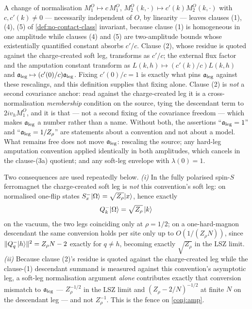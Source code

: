 \begin{scope}
\label{scope:amputation-convention}
A change of normalisation $M_1^O\mapsto c\,M_1^O$,
$M_2^O(k,\cdot)\mapsto c'(k)M_2^O(k,\cdot)$ with $c,c'(k)\neq0$ --- necessarily
independent of $O$, by linearity --- leaves clauses (1), (4), (5) of
\cref{def:no-contact-class} invariant, because clause (1) is homogeneous in
one amplitude while clauses (4) and (5) are two-amplitude bounds whose
existentially quantified constant absorbs $c'/c$. Clause (2), whose residue is
quoted against the charge-created soft leg, transforms as $c'/c$; the external
flux factor and the amputation constant transform as
$L(k,h)\mapsto(c'(k)/c)L(k,h)$ and $\mathfrak{a}_{\mathrm{leg}}\mapsto(c'(0)/c)\mathfrak{a}_{\mathrm{leg}}$. Fixing
$c'(0)/c=1$ is exactly what pins $\mathfrak{a}_{\mathrm{leg}}$ against these rescalings, and this
definition supplies that fixing alone. Clause (2) is \emph{not} a second
covariance anchor: read against the charge-created leg it is a
cross-normalisation \emph{membership} condition on the source, tying the
descendant term to $2iv_hM_1^O$, and it is that --- not a second fixing of the
covariance freedom --- which makes $\mathfrak{a}_{\mathrm{leg}}$ a number rather than a name. Without
both, the assertions ``$\mathfrak{a}_{\mathrm{leg}}=1$'' and ``$\mathfrak{a}_{\mathrm{leg}}=1/Z_\rho$'' are statements
about a convention and not about a model. What remains free does not move
$\mathfrak{a}_{\mathrm{leg}}$: rescaling the source; any hard-leg amputation convention applied
identically in both amplitudes, which cancels in the clause-(3a) quotient; and
any soft-leg envelope with $\lambda(0)=1$.

Two consequences are used repeatedly below. \emph{(i)} In the fully polarised
spin-$S$ ferromagnet the charge-created soft leg is \emph{not} this
convention's soft leg: on normalised one-flip states
$S^-_x|\Omega\rangle=\sqrt{Z_\rho}|x\rangle$, hence exactly
\begin{equation}
  Q^-_k|\Omega\rangle=\sqrt{Z_\rho}\,|k\rangle
  \label{eq:d24-leg-conversion}
\end{equation}
on the vacuum, the two legs coinciding only at $\rho=1/2$; on a one-hard-magnon
descendant the same conversion holds per site only up to $O(1/(Z_\rho N))$,
since $\lVert Q^-_q|h\rangle\rVert^2=Z_\rho N-2$ exactly for $q\neq h$, becoming exactly
$\sqrt{Z_\rho}$ in the LSZ limit. \emph{(ii)} Because clause (2)'s residue is
quoted against the charge-created leg while the clause-(1) descendant summand
is measured against this convention's asymptotic leg, a soft-leg normalisation
argument \emph{alone} contributes exactly that conversion mismatch to $\mathfrak{a}_{\mathrm{leg}}$
--- $Z_\rho^{-1/2}$ in the LSZ limit and $(Z_\rho-2/N)^{-1/2}$ at finite $N$ on
the descendant leg --- and not $Z_\rho^{-1}$. This is the fence on
\cref{conj:amp}.
\end{scope}

